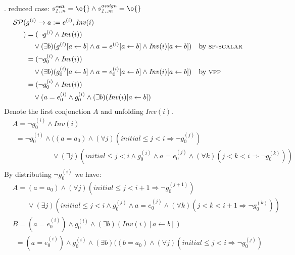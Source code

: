 \documentclass[a4paper,10pt]{article}
\newcommand{\idx}{\ensuremath{i}\xspace}
\newcommand{\idxinitial}{\ensuremath{\mathit{initial}}\xspace}
\newcommand{\at}[1]{{(#1)}}
\newcommand{\impl}{\ensuremath{\Longrightarrow}}
\newcommand{\Inv}[1]{\ensuremath{\mathit{Inv}(#1)\xspace}}
\newcommand{\gstatement}[2]{\ensuremath{s^{\mathit{#1}}_{\mathit{#2}}\xspace}}
\newcommand{\vpp}{\textsc{vpp}\xspace}
\newcommand{\spscalar}{\textsc{sp-scalar}\xspace}
\newenvironment{proof}[1][Proof.]{\begin{trivlist}
\item[\hskip \labelsep {\bfseries #1}]}{\end{trivlist}}
\begin{document}
\begin{proof}
. reduced case: $\gstatement{exit}{1..n} = \o{} \land \gstatement{assign}{1..m} = \o{}$
  \begin{align*}
    \spost{
    & g^\at{\idx} \rightarrow a := e^\at{\idx}}{\Inv{\idx}\\
    }
    &=(\neg g^\at{\idx} \land \Inv{\idx}) \\
    &\quad \lor (\exists b) (g^\at{\idx}[a\leftarrow b] \land 
      a = e^\at{\idx}[a\leftarrow b] \land \Inv{\idx}[a\leftarrow b])   && \text{by \spscalar}\\
    &=(\neg g_0^\at{\idx} \land \Inv{\idx}) \\
    &\quad \lor (\exists b) (g_0^\at{\idx}[a\leftarrow b] \land 
      a = e_0^\at{\idx}[a\leftarrow b] \land \Inv{\idx}[a\leftarrow b])   && \text{by \vpp}\\
    &=(\neg g_0^\at{\idx} \land \Inv{\idx}) \\
    &\quad \lor ( a = e_0^\at{\idx} \land g_0^\at{\idx} \land (\exists b)(\Inv{\idx}[a\leftarrow b])
  \end{align*}
  Denote the first conjonction $A$ and unfolding $\Inv{\idx}$.
  \begin{align*}
    &A=\neg g_0^\at{\idx} \land \Inv{\idx} \\
    &~~=\neg g_0^\at{\idx} \land ((a = a_0) \land (\forall j)(\idxinitial \leq j <\idx \impl \neg g_0^\at{j})\\
    &\phantom{A= g_0^\at{\idx} \land (}
       \lor (\exists j)(\idxinitial \leq j <\idx \land g_0^\at{j} \land a = e_0^\at{j} \land (\forall k)(j< k < \idx \impl \neg g_0^\at{k}))\\
  \end{align*}
  By distributing $\neg g_0^\at{\idx}$ we have:
  \begin{align*}
    &A= (a = a_0) \land (\forall j)(\idxinitial \leq j < \idx+1 \impl \neg g_0^\at{j+1})\\
    &\phantom{A=}
       \lor (\exists j)(\idxinitial \leq j < \idx \land g_0^\at{j} \land a = e_0^\at{j} \land (\forall k)(j < k < \idx+1 \impl \neg g_0^\at{k}))
  \end{align*}
  \begin{align*}
    &B=(a = e_0^\at{\idx}) \land g_0^\at{\idx} \land (\exists b) (\Inv{\idx}[a\leftarrow b])\\
    &~~=(a = e_0^\at{\idx}) \land g_0^\at{\idx} \land (\exists b) ((b = a_0) \land (\forall j)(\idxinitial \leq j < \idx \impl \neg g_0^\at{j})\\ 
    &\phantom{B=(a = e_0^\at{\idx}) \land g_0^\at{\idx} \land (\exists b)}

\end{align*}
\end{proof}
\end{document}
